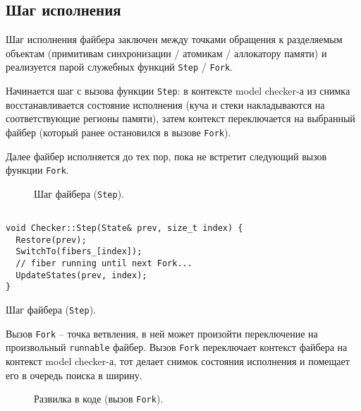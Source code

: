 \subsection{Шаг исполнения}

Шаг исполнения файбера заключен между точками обращения к разделяемым объектам (примитивам синхронизации / атомикам / аллокатору памяти) и реализуется парой служебных функций \texttt{Step} / \texttt{Fork}.

Начинается шаг с вызова функции \texttt{Step}: в контексте model checker-а из снимка восстанавливается состояние исполнения (куча и стеки накладываются на соответствующие регионы памяти), затем контекст переключается на выбранный файбер (который ранее остановился в вызове \texttt{Fork}).

Далее файбер исполняется до тех пор, пока не встретит следующий вызов функции \texttt{Fork}.


\begin{figure}
	\bigskip
	\caption{Шаг файбера (\texttt{Step}).}\label{fig:step}
\end{figure}

\else

\begin{listing}
	\centering
	
	\begin{verbatim}
    
void Checker::Step(State& prev, size_t index) {
  Restore(prev);
  SwitchTo(fibers_[index]);
  // fiber running until next Fork...
  UpdateStates(prev, index);
}

	\end{verbatim}
	\caption{Шаг файбера (\texttt{Step}).}
	\label{step}
\end{listing}

\fi

Вызов \texttt{Fork} – точка ветвления, в ней может произойти переключение на произвольный \texttt{runnable} файбер. Вызов \texttt{Fork} переключает контекст файбера на контекст model checker-а, тот делает снимок состояния исполнения и помещает его в очередь поиска в ширину.

\begin{figure}
	\caption{Развилка в коде (вызов \texttt{Fork}).}\label{fig:fork}
\end{figure}

